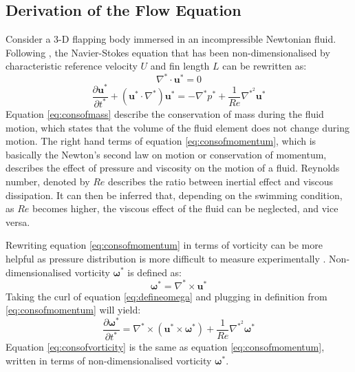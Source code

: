 \subsection{Derivation of the Flow Equation}
\label{sec:8}
Consider a 3-D flapping body immersed in an incompressible Newtonian fluid. Following \citet{borazjani}, the Navier-Stokes equation that has been non-dimensionalised by characteristic reference velocity $U$ and fin length $L$ can be rewritten as:
\begin{equation}
    \nabla^{*} \cdot \mathbf{u}^{*} = 0
    \label{eq:consofmass}
\end{equation}
\begin{equation}
    \frac{\partial \mathbf{u}^{*}}{\partial t^{*}} + \left(\mathbf{u}^{*} \cdot \nabla^{*} \right) \mathbf{u}^{*} = -\nabla^{*}p^{*} + \frac{1}{Re} \nabla^{*^{2}}\mathbf{u}^{*}
    \label{eq:consofmomentum}
\end{equation}
Equation \ref{eq:consofmass} describe the conservation of mass during the fluid motion, which states that the volume of the fluid element does not change during motion. The right hand terms of equation \ref{eq:consofmomentum}, which is basically the Newton's second law on motion or conservation of momentum, describes the effect of pressure and viscosity on the motion of a fluid. Reynolds number, denoted by $Re$ describes the ratio between inertial effect and viscous dissipation. It can then be inferred that, depending on the swimming condition, as $Re$ becomes higher, the viscous effect of the fluid can be neglected, and vice versa.\par
Rewriting equation \ref{eq:consofmomentum} in terms of vorticity can be more helpful as pressure distribution is more difficult to measure experimentally \citep{dea}. Non-dimensionalised vorticity $\boldsymbol{\omega}^{*}$ is defined as:
\begin{equation}
    \boldsymbol{\omega}^{*} = \nabla^{*} \times \mathbf{u}^{*}
    \label{eq:defineomega}
\end{equation}
Taking the curl of equation \ref{eq:defineomega} and plugging in definition from \ref{eq:consofmomentum} will yield:
\begin{equation}
    \frac{\partial \boldsymbol{\omega}^{*}}{\partial t^{*}} = \nabla^{*} \times \left(\mathbf{u}^{*} \times \boldsymbol{\omega}^{*} \right) + \frac{1}{Re} \nabla^{*^{2}} \boldsymbol{\omega}^{*}
    \label{eq:consofvorticity}
\end{equation}
Equation \ref{eq:consofvorticity} is the same as equation \ref{eq:consofmomentum}, written in terms of non-dimensionalised vorticity $\boldsymbol{\omega}^{*}$.\par
